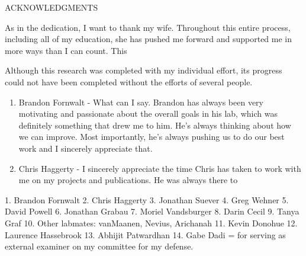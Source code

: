 
\setcounter{page}{3} %

\begin{center}
	ACKNOWLEDGMENTS
\end{center}

\indent As in the dedication, I want to thank my wife. Throughout this entire process, including all of my education, she has pushed me forward and supported me in more ways than I can count. This 

\indent Although this research was completed with my individual effort, its progress could not have been completed without the efforts of several people.

\begin{enumerate}
	\item Brandon Fornwalt - What can I say. Brandon has always been very motivating and passionate about the overall goals in his lab, which was definitely something that drew me to him. He's always thinking about how we can improve. Most importantly, he's always pushing us to do our best work and I sincerely appreciate that. 
	\item Chris Haggerty - I sincerely appreciate the time Chris has taken to work with me on my projects and publications. He was always there to 
\end{enumerate}

1. Brandon Fornwalt
2. Chris Haggerty
3. Jonathan Suever
4. Greg Wehner
5. David Powell
6. Jonathan Grabau
7. Moriel Vandsburger
8. Darin Cecil
9. Tanya Graf
10. Other labmates: vanMaanen, Nevius, Arichanah
11. Kevin Donohue
12. Laurence Hassebrook
13. Abhijit Patwardhan
14. Gabe Dadi = for serving as external examiner on my committee for my defense.
